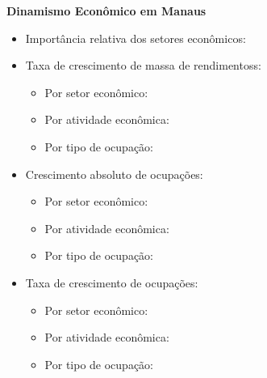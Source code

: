 \documentclass[8pt]{beamer}
\begin{document}
\begin{frame}[label=indice_principal_amz_manaus]{}

\textit{\hyperlink{indice_principal}{}}

\textbf{Dinamismo Econômico em Manaus}
\vspace{2mm}

\begin{itemize}

\item{Importância relativa dos setores econômicos: \hyperlink{_amz_manaus_importancia_relativa}{}}
\vspace{1mm}

\item{Taxa de crescimento  de massa de rendimentoss:
	\begin{itemize}
	\item{Por setor econômico: \hyperlink{amzmanausrkngtxmassaporsetor}{}}
	\item{Por atividade econômica: \hyperlink{amzmanausrkngtxmassaporatividade}{}}
	\item{Por tipo de ocupação: \hyperlink{amzmanausrkngtxmassaporocupacao}{}}
	\end{itemize}
}
\vspace{1mm}

\item{Crescimento  absoluto de ocupações:
	\begin{itemize}
	\item{Por setor econômico: \hyperlink{amzmanausrkngnocuporsetor}{}}
	\item{Por atividade econômica: \hyperlink{amzmanausrkngnocuporatividade}{}}
	\item{Por tipo de ocupação: \hyperlink{amzmanausrkngnocuporocupacao}{}}
	\end{itemize}
}
\vspace{1mm}

\item{Taxa de crescimento de ocupações:
	\begin{itemize}
	\item{Por setor econômico: \hyperlink{amzmanausrkngtxocuporsetor}{}}
	\item{Por atividade econômica: \hyperlink{amzmanausrkngtxocuporatividade}{}}
	\item{Por tipo de ocupação: \hyperlink{amzmanausrkngtxocuporocupacao}{}}
	\end{itemize}
}
\vspace{1mm}


\end{itemize}
\end{frame}
\end{document}

